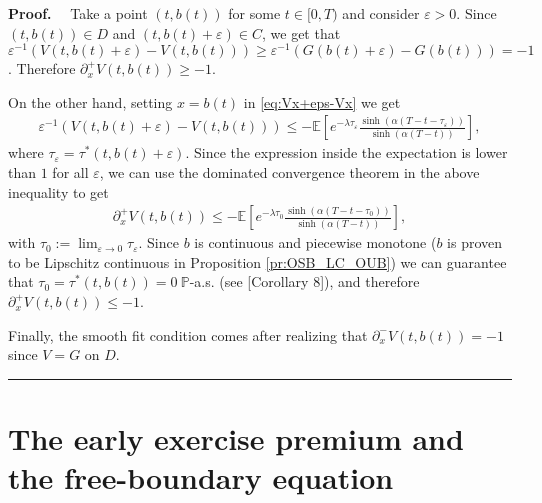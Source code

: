 \documentclass{tufte-handout}
\newcommand{\E}{\mathbb{E}} %
\renewcommand{\Pr}{\mathbb{P}} %
\newenvironment{pf}[1][Proof]{\textbf{#1.} }{\ \rule{0.5em}{0.5em}}
\begin{document}
	\begin{pf}
		\ \ Take a point $(t, b(t))$ for some $t\in[0, T)$ and consider $\varepsilon > 0$. Since $(t, b(t)) \in D$ and $(t, b(t) + \varepsilon) \in C$, we get that $\varepsilon^{-1}(V(t, b(t) + \varepsilon) - V(t, b(t))) \geq \varepsilon^{-1}(G(b(t) + \varepsilon) - G(b(t))) = -1$. Therefore $\partial_x^+V(t, b(t)) \geq -1$. 
		
		On the other hand, setting $x = b(t)$ in \eqref{eq:Vx+eps-Vx} we get
		\begin{align*}
		\varepsilon^{-1}(V(t, b(t) + \varepsilon) - V(t, b(t))) \leq -\E\left[e^{-\lambda\tau_\varepsilon}\frac{\sinh(\alpha (T - t - \tau_\varepsilon))}{\sinh(\alpha (T - t))}\right],
		\end{align*}
		where $\tau_\varepsilon = \tau^*(t, b(t) + \varepsilon)$. Since the expression inside the expectation is lower than $1$ for all $\varepsilon$, we can use the dominated convergence theorem in the above inequality to get
		\begin{align}
		\partial_x^+V(t, b(t)) \leq -\E\left[e^{-\lambda\tau_0}\frac{\sinh(\alpha (T - t - \tau_0))}{\sinh(\alpha (T - t))}\right],
		\end{align}
		with $\tau_0 := \lim_{\varepsilon\rightarrow0} \tau_\varepsilon$. Since $b$ is continuous and piecewise monotone ($b$ is proven to be Lipschitz continuous in Proposition \ref{pr:OSB_LC_OUB}) we can guarantee that $\tau_0 = \tau^{*}(t, b(t)) = 0\ \Pr$-a.s. (see \citet{cox_embedding_2015}[Corollary 8]), and therefore $\partial_x^+V(t, b(t)) \leq -1$.
		
		Finally, the smooth fit condition comes after realizing that $\partial_x^-V(t, b(t)) = -1$ since $V = G$ on $D$.   
	\end{pf}
	
	\section{The early exercise premium and the free-boundary equation}
	
\end{document}
